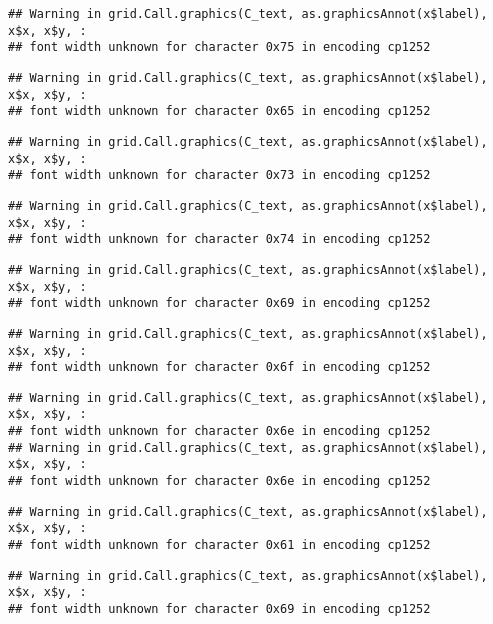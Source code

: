 \documentclass[
]{article}
\begin{document}
\begin{verbatim}
## Warning in grid.Call.graphics(C_text, as.graphicsAnnot(x$label), x$x, x$y, :
## font width unknown for character 0x75 in encoding cp1252
\end{verbatim}

\begin{verbatim}
## Warning in grid.Call.graphics(C_text, as.graphicsAnnot(x$label), x$x, x$y, :
## font width unknown for character 0x65 in encoding cp1252
\end{verbatim}

\begin{verbatim}
## Warning in grid.Call.graphics(C_text, as.graphicsAnnot(x$label), x$x, x$y, :
## font width unknown for character 0x73 in encoding cp1252
\end{verbatim}

\begin{verbatim}
## Warning in grid.Call.graphics(C_text, as.graphicsAnnot(x$label), x$x, x$y, :
## font width unknown for character 0x74 in encoding cp1252
\end{verbatim}

\begin{verbatim}
## Warning in grid.Call.graphics(C_text, as.graphicsAnnot(x$label), x$x, x$y, :
## font width unknown for character 0x69 in encoding cp1252
\end{verbatim}

\begin{verbatim}
## Warning in grid.Call.graphics(C_text, as.graphicsAnnot(x$label), x$x, x$y, :
## font width unknown for character 0x6f in encoding cp1252
\end{verbatim}

\begin{verbatim}
## Warning in grid.Call.graphics(C_text, as.graphicsAnnot(x$label), x$x, x$y, :
## font width unknown for character 0x6e in encoding cp1252
## Warning in grid.Call.graphics(C_text, as.graphicsAnnot(x$label), x$x, x$y, :
## font width unknown for character 0x6e in encoding cp1252
\end{verbatim}

\begin{verbatim}
## Warning in grid.Call.graphics(C_text, as.graphicsAnnot(x$label), x$x, x$y, :
## font width unknown for character 0x61 in encoding cp1252
\end{verbatim}

\begin{verbatim}
## Warning in grid.Call.graphics(C_text, as.graphicsAnnot(x$label), x$x, x$y, :
## font width unknown for character 0x69 in encoding cp1252
\end{verbatim}
\end{document}
